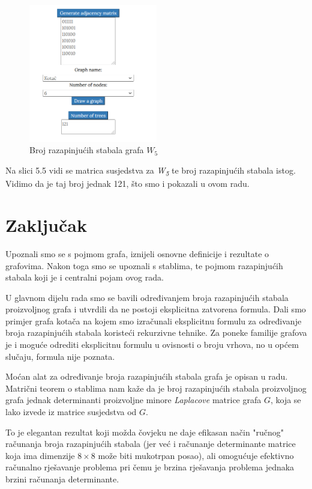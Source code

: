 \documentclass[times, utf8, zavrsni]{fer}
\begin{document}
\begin{figure}[htb]
	\centering
	\includegraphics[width=0.5\textwidth]{slike/kotacbroj.png}
	\caption{Broj razapinjućih stabala grafa $W_5$}
	\label{fig:kotac-broj}
\end{figure}

Na slici 5.5 vidi se matrica susjedstva za \textit{W\textsubscript{5}} te broj razapinjućih stabala istog. Vidimo da je taj broj jednak 121, što smo i pokazali u ovom radu.

\chapter{Zaključak}


Upoznali smo se s pojmom grafa, iznijeli osnovne definicije i rezultate o grafovima. Nakon toga smo se upoznali s stablima, te pojmom razapinjućih stabala koji je i centralni pojam ovog rada.

U glavnom dijelu rada smo se bavili određivanjem broja razapinjućih stabala proizvoljnog grafa i utvrdili da ne postoji eksplicitna zatvorena formula. Dali smo primjer grafa kotača na kojem smo izračunali eksplicitnu formulu za određivanje broja razapinjućih stabala koristeći rekurzivne tehnike. Za poneke familije grafova je i moguće odrediti eksplicitnu formulu u ovisnosti o broju vrhova, no u općem slučaju, formula nije poznata.

Moćan alat za određivanje broja razapinjućih stabala grafa je opisan u radu. Matrični teorem o stablima nam kaže da je broj razapinjućih stabala proizvoljnog grafa jednak determinanti proizvoljne minore \textit{Laplacove} matrice grafa $G$, koja se lako izvede iz matrice susjedstva od $G$.

To je elegantan rezultat koji možda čovjeku ne daje efikasan način "ručnog" računanja broja razapinjućih stabala (jer već i računanje determinante matrice koja ima dimenzije $8 \times 8$ može biti mukotrpan posao), ali omogućuje efektivno računalno rješavanje problema pri čemu je brzina rješavanja problema jednaka brzini računanja determinante. 
\end{document}
